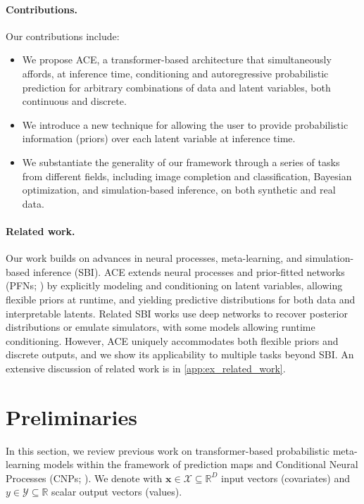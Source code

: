 \documentclass[twoside]{article}
\newcommand{\x}{\mathbf{x}}
\newcommand{\y}{\mathbf{y}}
\newcommand{\XX}{\mathcal{X}}
\newcommand{\YY}{\mathcal{Y}}
\begin{document}
\paragraph{Contributions.} Our contributions include: 
\begin{itemize}[nosep]
\item We propose ACE, a transformer-based architecture that simultaneously affords, at inference time, conditioning and autoregressive probabilistic prediction for arbitrary combinations of data and latent variables, both continuous and discrete.
\item We introduce a new technique for allowing the user to provide probabilistic information (priors) over each latent variable at inference time. %
\item We substantiate the generality of our framework through a series of tasks from different fields, including image completion and classification, Bayesian optimization, and simulation-based inference, on both synthetic and real data.\end{itemize}

\vspace{-0.25em}
\paragraph{Related work.} Our work builds on advances in neural processes, meta-learning, and simulation-based inference (SBI). ACE extends neural processes \citep{garnelo2018neural, garnelo2018conditional, kim2019attentive, nguyen2022transformer} and prior-fitted networks (PFNs; \citealp{muller2022transformers}) by explicitly modeling and conditioning on latent variables, allowing flexible priors at runtime, and yielding predictive distributions for both data and interpretable latents. Related SBI works \citep{cranmer2020frontier, radev2023jana, gloeckler2024all} use deep networks to recover posterior distributions or emulate simulators, with some models allowing runtime conditioning. However, ACE uniquely accommodates both flexible priors and discrete outputs, and we show its applicability to multiple tasks beyond SBI. An extensive discussion of related work is in  \cref{app:ex_related_work}.

\section{Preliminaries}
\label{sec:preliminaries}

In this section, we review previous work on transformer-based probabilistic meta-learning models within the framework of prediction maps \citep{foong2020meta, markou2022practical} and Conditional Neural Processes (CNPs; \citealp{garnelo2018conditional}).
We denote with $\x \in \XX \subseteq \mathbb{R}^{D}$ input vectors (covariates) and $y \in \YY \subseteq \mathbb{R}$ scalar output vectors (values). %
\end{document}
